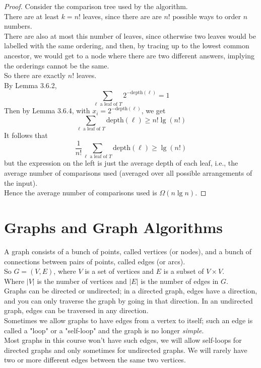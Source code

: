 \documentclass[12pt]{article}
\theoremstyle{plain}
\theoremstyle{definition}
\begin{document}
\begin{proof}
Consider the comparison tree used by the algorithm. \\
There are at least $k = n!$ leaves, since there are are $n!$ possible ways to order $n$ numbers. \\
There are also at most this number of leaves, since otherwise two leaves would be labelled with the same ordering, and then, by tracing up to the lowest common ancestor, we would get to a node where there are two different answers, implying the orderings cannot be the same. \\
So there are exactly $n!$ leaves. \\
By Lemma 3.6.2,
$$\sum_{\ell \text{ a leaf of } T}2^{-\text{depth}(\ell)} = 1$$
Then by Lemma 3.6.4, with $x_{i} = 2^{-\text{depth}(\ell)}$, we get
$$\sum_{\ell \text{ a leaf of } T}\text{depth}(\ell) \geq n! \lg(n!)$$
It follows that
$$\frac{1}{n!}\sum_{\ell \text{ a leaf of } T}\text{depth}(\ell) \geq \lg(n!)$$
but the expression on the left is just the average depth of each leaf, i.e., the average number of comparisons used (averaged over all possible arrangements of the input). \\
Hence the average number of comparisons used is $\Omega(n \lg{n})$.
\end{proof}

\newpage
\section{Graphs and Graph Algorithms}
A graph consists of a bunch of points, called vertices (or nodes), and a bunch of connections between pairs of points, called edges (or arcs). \\
So $G = (V, E)$, where $V$ is a set of vertices and $E$ is a subset of $V \times V$. \\
Where $|V|$ is the number of vertices and $|E|$ is the number of edges in $G$. \\

Graphs can be directed or undirected;
in a directed graph, edges have a direction, and you can only traverse the graph by going in that direction.
In an undirected graph, edges can be traversed in any direction. \\

Sometimes we allow graphs to have edges from a vertex to itself;
such an edge is called a "loop" or a "self-loop" and the graph is no longer \emph{simple}. \\
Most graphs in this course won't have such edges, we will allow self-loops for directed graphs and only sometimes for undirected graphs.
We will rarely have two or more different edges between the same two vertices. \\
\end{document}
